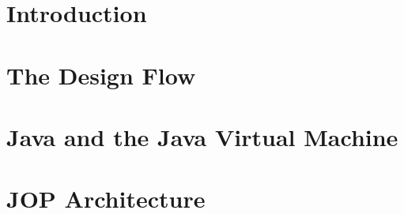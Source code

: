 



%






\frontmatter \pagestyle{empty}



\pagestyle{scrheadings}

\tableofcontents \cleardoublepage

\mainmatter


\chapter{Introduction}
\label{chap:intro}
    






\chapter{The Design Flow}
\label{chap:build}




\chapter{Java and the Java Virtual Machine}
\label{chap:java}


%
%    

\chapter{JOP Architecture}
\label{chap:arch}

